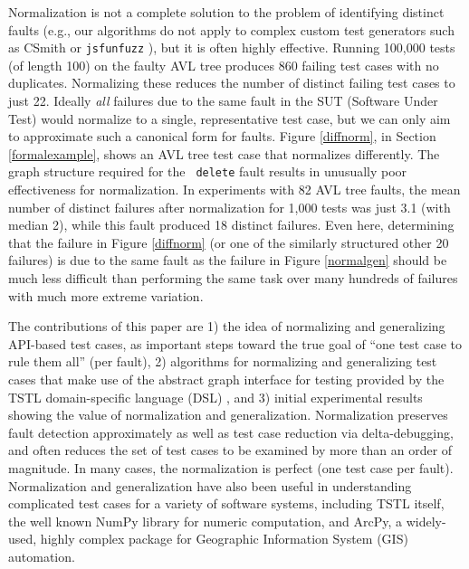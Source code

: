 Normalization is not a complete solution to the problem of identifying
distinct faults (e.g., our algorithms do not apply to complex custom
test generators such as CSmith \cite{csmith} or {\tt jsfunfuzz}
\cite{jsfunfuzz}), but it is often highly effective.  Running 100,000
tests (of length 100) on the faulty AVL tree produces 860 failing test
cases with no duplicates.  Normalizing these reduces the number of
distinct failing test cases to just 22.  Ideally \emph{all} failures
due to the same fault in the SUT (Software Under Test) would normalize
to a single, representative test case, but we can only aim to
approximate such a canonical form for faults.  Figure \ref{diffnorm},
in Section \ref{formalexample}, shows an AVL tree test case that
normalizes differently.  The graph structure required for the {\tt
  delete} fault results in
unusually poor effectiveness for normalization.  In experiments with 82 AVL tree faults,
the mean number of distinct failures after normalization for 1,000
tests was just 3.1 (with median 2), while this fault produced 18
distinct failures.  Even here, determining that the failure in Figure
\ref{diffnorm} (or one of the similarly structured other 20 failures)
is due to the same fault as the failure in Figure \ref{normalgen}
should be much less difficult than performing the same task over many hundreds of failures with much more extreme variation. 

The contributions of this paper are 1) the idea of normalizing and
generalizing API-based test cases, as important steps toward the true goal of
``one test case to rule them all'' (per fault), 2) algorithms for
normalizing and generalizing test cases that make use of the abstract
graph interface for testing provided by the TSTL
\cite{tstl,NFM15,ISSTA15} domain-specific language (DSL) \cite{Fow10}, and 3) initial
experimental results showing the value of normalization and
generalization.  Normalization preserves fault
detection approximately as well as test case reduction via
delta-debugging, and often reduces the set of test cases to be
examined by more than an order of magnitude. In many cases, the
normalization is perfect (one test case per fault).  Normalization and generalization have also been useful in
understanding complicated test cases for a variety of software systems, including
TSTL itself, the well known NumPy library for numeric computation, and
ArcPy, a widely-used, highly complex package for Geographic
Information System (GIS) automation.

